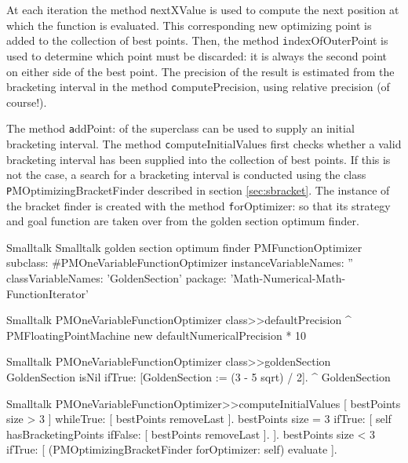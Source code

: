 At each iteration the method {\texttt nextXValue} is used to compute
the next position at which the function is evaluated. This
corresponding new optimizing point is added to the collection of
best points. Then, the method {\texttt indexOfOuterPoint} is used to
determine which point must be discarded: it is always the second
point on either side of the best point. The precision of the
result is estimated from the bracketing interval in the method
{\texttt computePrecision}, using relative precision (of course!).

The method {\texttt addPoint:} of the superclass can be used to supply
an initial bracketing interval. The method {\texttt
computeInitialValues} first checks whether a valid bracketing
interval has been supplied into the collection of best points. If
this is not the case, a search for a bracketing interval is
conducted using the class {\texttt PMOptimizingBracketFinder}
described in section \ref{sec:sbracket}. The instance of the
bracket finder is created with the method {\texttt forOptimizer:} so
that its strategy and goal function are taken over from the golden
section optimum finder.

\begin{listing}[label=ls:optimizerOneDim]{Smalltalk}
{Smalltalk golden section optimum finder}
PMFunctionOptimizer subclass: #PMOneVariableFunctionOptimizer
   instanceVariableNames: ''
   classVariableNames: 'GoldenSection'
   package: 'Math-Numerical-Math-FunctionIterator'
\end{listing}

\begin{displaycode}{Smalltalk}
PMOneVariableFunctionOptimizer class>>defaultPrecision
    ^ PMFloatingPointMachine new defaultNumericalPrecision * 10
\end{displaycode}

\begin{displaycode}{Smalltalk}
PMOneVariableFunctionOptimizer class>>goldenSection
    GoldenSection isNil ifTrue: [GoldenSection := (3 - 5 sqrt) / 2].
    ^ GoldenSection
\end{displaycode}

\begin{displaycode}{Smalltalk}
PMOneVariableFunctionOptimizer>>computeInitialValues
    [ bestPoints size  > 3 ] whileTrue: [ bestPoints removeLast ].
    bestPoints size = 3
        ifTrue: [ self hasBracketingPoints
                    ifFalse: [ bestPoints removeLast ].
                ].
    bestPoints size < 3
        ifTrue: [ (PMOptimizingBracketFinder forOptimizer: self) evaluate ].
\end{displaycode}

